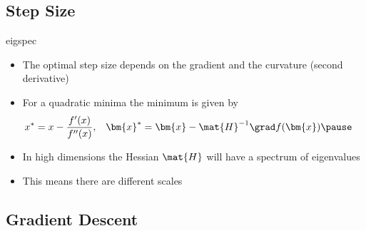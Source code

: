 \begin{slide}
\section[-2]{Step Size}

\begin{rightImage}{eigspec}
\begin{PauseHighLight}
  \begin{itemize}
  \item The optimal step size depends on the gradient and the
    curvature (second derivative)\pause
  \item For a quadratic minima the minimum is given by
    \begin{align*}
      x^* &= x - \frac{f'(x)}{f''(x)},
      &
      \bm{x}^* &= \bm{x} - \mat{H}^{-1} \grad f(\bm{x})\pause
    \end{align*}
  \item In high dimensions the Hessian $\mat{H}$ will have a spectrum
    of eigenvalues\pause
  \item This means there are different scales\pause
  \end{itemize}
\end{PauseHighLight}
  
\end{rightImage}

\end{slide}


\begin{slide}
\section{Gradient Descent}

\pb\pause{}
\begin{center}
  \pause
\end{center}
\end{slide}



